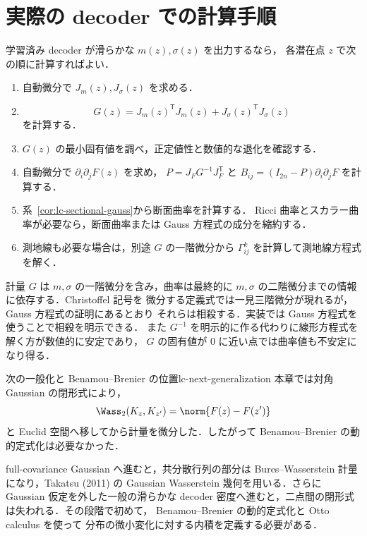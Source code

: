 \section{実際の decoder での計算手順}
\label{sec:lc-computation-map}

学習済み decoder が滑らかな $m(z),\sigma(z)$ を出力するなら，
各潜在点 $z$ で次の順に計算すればよい．

\begin{enumerate}
  \item 自動微分で $J_m(z),J_\sigma(z)$ を求める．
  \item
    \[
      G(z)=J_m(z)^{\mathsf T}J_m(z)
           +J_\sigma(z)^{\mathsf T}J_\sigma(z)
    \]
    を計算する．
  \item $G(z)$ の最小固有値を調べ，正定値性と数値的な退化を確認する．
  \item 自動微分で $\partial_i\partial_jF(z)$ を求め，
    $P=J_FG^{-1}J_F^{\mathsf T}$ と
    $B_{ij}=(I_{2n}-P)\partial_i\partial_jF$ を計算する．
  \item 系~\ref{cor:lc-sectional-gauss}から断面曲率を計算する．
    Ricci 曲率とスカラー曲率が必要なら，断面曲率または
    Gauss 方程式の成分を縮約する．
  \item 測地線も必要な場合は，別途 $G$ の一階微分から
    $\Gamma^k_{ij}$ を計算して測地線方程式を解く．
\end{enumerate}

計量 $G$ は $m,\sigma$ の一階微分を含み，曲率は最終的に
$m,\sigma$ の二階微分までの情報に依存する．Christoffel 記号を
微分する定義式では一見三階微分が現れるが，Gauss 方程式の証明にあるとおり
それらは相殺する．実装では Gauss 方程式を使うことで相殺を明示できる．
また
$G^{-1}$ を明示的に作る代わりに線形方程式を解く方が数値的に安定であり，
$G$ の固有値が $0$ に近い点では曲率値も不安定になり得る．

\begin{remark}{次の一般化と Benamou--Brenier の位置}{lc-next-generalization}
  本章では対角 Gaussian の閉形式により，
  \[
    \Wass_2(K_z,K_{z'})=\norm{F(z)-F(z')}
  \]
  と Euclid 空間へ移してから計量を微分した．したがって
  Benamou--Brenier の動的定式化は必要なかった．

  full-covariance Gaussian へ進むと，共分散行列の部分は
  Bures--Wasserstein 計量になり，Takatsu (2011) の Gaussian
  Wasserstein 幾何を用いる．さらに Gaussian 仮定を外した一般の滑らかな
  decoder 密度へ進むと，二点間の閉形式は失われる．その段階で初めて，
  Benamou--Brenier の動的定式化と Otto calculus を使って
  分布の微小変化に対する内積を定義する必要がある．
\end{remark}

